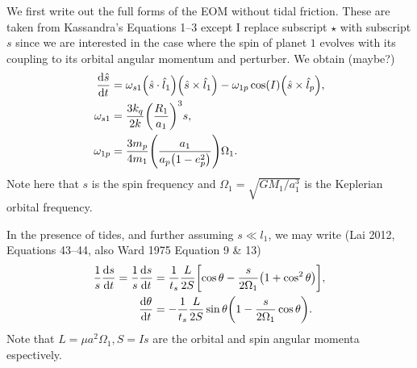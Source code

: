 \documentclass[11pt,
        usenames, %
        dvipsnames %
    ]{article}
\newcommand*{\rd}[2]{\frac{\mathrm{d}#1}{\mathrm{d}#2}}
\DeclarePairedDelimiter\p{\lparen}{\rparen}
\DeclarePairedDelimiter\s{\lbrack}{\rbrack}
\begin{document}
We first write out the full forms of the EOM without tidal friction. These are
taken from Kassandra's Equations 1--3 except I replace subscript $\star$ with
subscript $s$ since we are interested in the case where the spin of planet $1$
evolves with its coupling to its orbital angular momentum and perturber. We
obtain (maybe?)
\begin{align}
    \rd{\hat{s}}{t}
        &= \omega_{s1}\p*{\hat{s} \cdot \hat{l}_1}\p*{\hat{s} \times \hat{l}_1}
            - \omega_{1p}\cos(I)\p*{\hat{s} \times \hat{l}_p},\\
    \omega_{s1} &= \frac{3k_q}{2k} \p*{\frac{R_1}{a_1}}^3 s,\\
    \omega_{1p} &= \frac{3m_p}{4m_1}\p*{\frac{a_1}{a_p\p*{1 - e_p^2}}} \Omega_1.
\end{align}
Note here that $s$ is the spin frequency and $\Omega_1 =
\sqrt{GM_1/a_1^3}$ is the Keplerian orbital frequency.

In the presence of tides, and further assuming $s \ll l_1$, we may write (Lai
2012, Equations 43--44, also Ward 1975 Equation 9 \& 13)
\begin{align}
    \frac{1}{s}\rd{s}{t}
        = \frac{1}{s}\rd{s}{t}
        &= \frac{1}{t_s}\frac{L}{2S}\s*{\cos\theta
            - \frac{s}{2\Omega_1}\p*{1 + \cos^2\theta}},\\
    \rd{\theta}{t} &= -\frac{1}{t_s}\frac{L}{2S}
        \sin\theta\p*{1 - \frac{s}{2\Omega_1}\cos\theta}.
\end{align}
Note that $L = \mu a^2\Omega_1, S = Is$ are the orbital and spin angular momenta
espectively.
\end{document}
